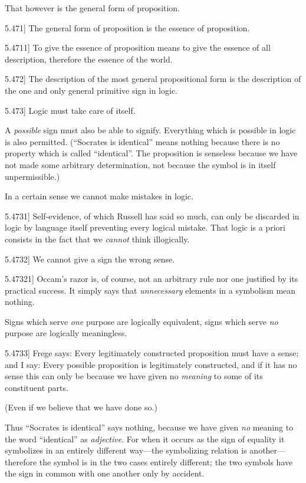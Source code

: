 \documentclass[12pt,oneside]{book}[2007/10/19]
\newcommand{\PropositionE}[2]{%
  \item[\phantomsection\label{PropE:#1}\PropGRef{#1}] #2%
}
\newcommand{\PropGRef}[1]{\hyperref[PropG:#1]{#1}}
\begin{document}
\begin{propositions}
{That however is the general form of proposition.}


\PropositionE{5.471}
{The general form of proposition is the essence
of proposition.}


\PropositionE{5.4711}
{To give the essence of proposition means to
give the essence of all description, therefore the
essence of the world.}


\PropositionE{5.472}
{The description of the most general propositional
form is the description of the one and only
general primitive sign in logic.}


\PropositionE{5.473}
{Logic must take care of itself.

A \emph{possible} sign must also be able to signify.
Everything which is possible in logic is also
permitted. (``Socrates is identical'' means nothing
because there is no property which is called
``identical''. The proposition is senseless because
we have not made some arbitrary determination,
not because the symbol is in itself unpermissible.)

In a certain sense we cannot make mistakes in
logic.}


\PropositionE{5.4731}
{Self-evidence, of which Russell has said so
much, can only be discarded in logic by language
itself preventing every logical mistake. That
logic is a priori consists in the fact that we \emph{cannot}
think illogically.}


\PropositionE{5.4732}
{We cannot give a sign the wrong sense.}


\PropositionE{5.47321}
{Occam's razor is, of course, not an arbitrary rule
nor one justified by its practical success. It simply
says that \emph{unnecessary} elements in a symbolism
mean nothing.

Signs which serve \emph{one} purpose are logically
equivalent, signs which serve \emph{no} purpose are
logically meaningless.}


\PropositionE{5.4733}
{Frege says: Every legitimately constructed
proposition must have a sense; and I say: Every
possible proposition is legitimately constructed,
and if it has no sense this can only be because
we have given no \emph{meaning} to some of its constituent
parts.

(Even if we believe that we have done
so.)

Thus ``Socrates is identical'' says nothing,
because we have given \emph{no} meaning to the word
``identical'' as \emph{adjective}. For when it occurs as
the sign of equality it symbolizes in an entirely
different way---the symbolizing relation is another---therefore
the symbol is in the two cases entirely
different; the two symbols have the sign in
common with one another only by accident.}



\end{propositions}
\end{document}
